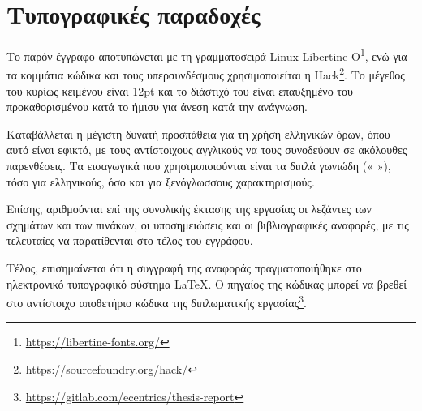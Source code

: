 \section{Τυπογραφικές παραδοχές} \label{section:1-6-typography}

Το παρόν έγγραφο αποτυπώνεται με τη γραμματοσειρά Linux Libertine O\footnote{\url{https://libertine-fonts.org/}}, ενώ για τα κομμάτια κώδικα και τους υπερσυνδέσμους χρησιμοποιείται η Hack\footnote{\url{https://sourcefoundry.org/hack/}}. Το μέγεθος του κυρίως κειμένου είναι 12pt και το διάστιχό του είναι επαυξημένο του προκαθορισμένου κατά το ήμισυ για άνεση κατά την ανάγνωση.

Καταβάλλεται η μέγιστη δυνατή προσπάθεια για τη χρήση ελληνικών όρων, όπου αυτό είναι εφικτό, με τους αντίστοιχους αγγλικούς να τους συνοδεύουν σε ακόλουθες παρενθέσεις. Τα εισαγωγικά που χρησιμοποιούνται είναι τα διπλά γωνιώδη (« »), τόσο για ελληνικούς, όσο και για ξενόγλωσσους χαρακτηρισμούς.

Επίσης, αριθμούνται επί της συνολικής έκτασης της εργασίας οι λεζάντες των σχημάτων και των πινάκων, οι υποσημειώσεις και οι βιβλιογραφικές αναφορές, με τις τελευταίες να παρατίθενται στο τέλος του εγγράφου.

Τέλος, επισημαίνεται ότι η συγγραφή της αναφοράς πραγματοποιήθηκε στο ηλεκτρονικό τυπογραφικό σύστημα \LaTeX. Ο πηγαίος της κώδικας μπορεί να βρεθεί στο αντίστοιχο αποθετήριο κώδικα της διπλωματικής εργασίας\footnote{\url{https://gitlab.com/ecentrics/thesis-report}}.

\newpage